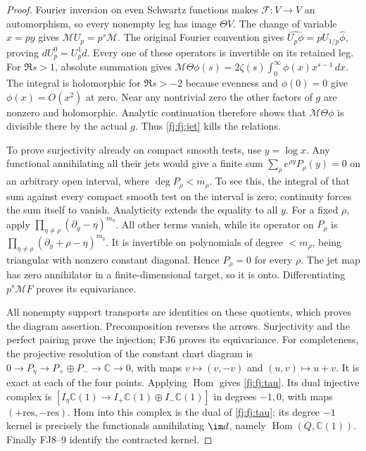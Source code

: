 \documentclass[11pt,a4paper]{article}
\theoremstyle{definition}\newtheorem{definition}[theorem]{Definition}
\newcommand{\C}{\mathbb C}\newcommand{\R}{\mathbb R}
\providecommand{\Hom}{\operatorname{Hom}}
\begin{document}
\begin{proof}
Fourier inversion on even Schwartz functions makes $\mathcal F:V\to V$
an automorphism, so every nonempty leg has image $\Theta V$.
The change of variable $x=py$ gives $\mathcal MU_p=p^s\mathcal M$.
The original Fourier convention gives
$\widehat{U_p\phi}=pU_{1/p}\widehat\phi$, proving $dU_p^0=U_p^1d$.
Every one of these operators is invertible on its retained leg.
For $\Re s>1$, absolute summation gives
$\mathcal M\Theta\phi(s)=2\zeta(s)\int_0^\infty\phi(x)x^{s-1}\,dx$.
The integral is holomorphic for $\Re s>-2$ because evenness and
$\phi(0)=0$ give $\phi(x)=O(x^2)$ at zero. Near any nontrivial
zero the other factors of $g$ are nonzero and holomorphic. Analytic
continuation therefore shows that $\mathcal M\Theta\phi$ is divisible
there by the actual $g$. Thus \eqref{fj:fj:jet} kills the relations.

To prove surjectivity already on compact smooth tests, use $y=\log x$.
Any functional annihilating all their jets would give a finite sum
$\sum_\rho e^{\rho y}P_\rho(y)=0$ on an arbitrary open interval,
where $\deg P_\rho<m_\rho$. To see this, the integral of that sum
against every compact smooth test on the interval is zero; continuity
forces the sum itself to vanish. Analyticity extends the equality to
all $y$. For a fixed $\rho$, apply
$\prod_{\eta\ne\rho}(\partial_y-\eta)^{m_\eta}$.
All other terms vanish, while its operator on $P_\rho$ is
$\prod_{\eta\ne\rho}(\partial_y+\rho-\eta)^{m_\eta}$.
It is invertible on polynomials of degree $<m_\rho$, being triangular
with nonzero constant diagonal. Hence $P_\rho=0$ for every $\rho$.
The jet map has zero annihilator in a finite-dimensional target, so
it is onto. Differentiating $p^s\mathcal MF$ proves its equivariance.

All nonempty support transports are identities on these quotients,
which proves the diagram assertion. Precomposition reverses the arrows.
Surjectivity and the perfect pairing prove the injection; FJ6 proves
its equivariance. For completeness, the projective resolution of the
constant chart diagram is
$0\to P_\eta\to P_+\oplus P_-\to\C\to0$, with maps
$v\mapsto(v,-v)$ and $(u,v)\mapsto u+v$.
It is exact at each of the four points. Applying $\Hom$ gives
\eqref{fj:fj:tau}. Its dual injective complex is
$[I_\eta\C(1)\to I_+\C(1)\oplus I_-\C(1)]$ in degrees $-1,0$,
with maps $(+\mathrm{res},-\mathrm{res})$.
Hom into this complex is the dual of \eqref{fj:fj:tau}; its degree $-1$
kernel is precisely the functionals annihilating $\im d$, namely
$\Hom(Q,\C(1))$. Finally FJ8--9 identify the contracted kernel.
\end{proof}
\end{document}
